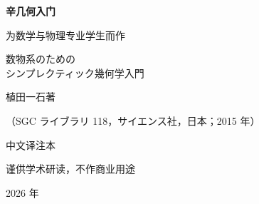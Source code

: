 \begin{titlepage}
\centering
\vspace*{2.6cm}
{\Huge\bfseries 辛几何入门\par}
\vspace{0.8cm}
{\large 为数学与物理专业学生而作\par}
\vspace{1.4cm}
{\Large 数物系のための\\[6pt]シンプレクティック幾何学入門\par}
\vspace{2.2cm}
{\Large 植田一石\quad 著\par}
\vspace{0.6cm}
{\large （SGC ライブラリ 118，サイエンス社，日本；2015 年）\par}
\vspace{2.4cm}
{\LARGE 中\quad 文\quad 译\quad 注\quad 本\par}
\vspace{1.0cm}
{\large 谨供学术研读，不作商业用途\par}
\vfill
{\large 2026 年\par}
\end{titlepage}
